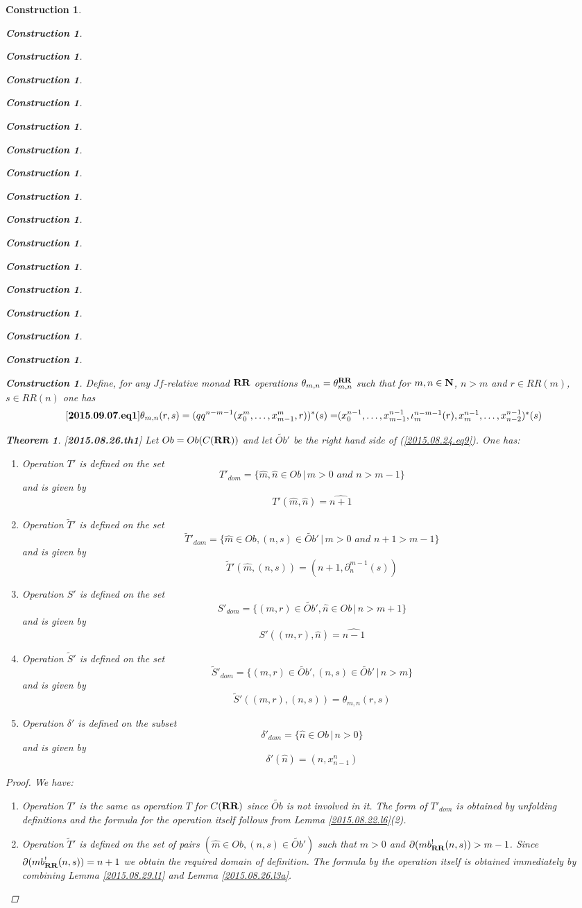 \documentclass[12pt]{amsart}
\newenvironment{eq}{\begin{equation}}{\end{equation}}
\newtheorem{theorem}[proposition]{Theorem}
\newtheorem{construction}[proposition]{Construction}
\newcommand{\llabel}[1]{\label{#1}[{\bf #1}]}
\newcommand{\nn}{{\bf N\rm}}
\newcommand{\nat}{\nn}
\newcommand{\wt}{\widetilde}
\newcommand{\wh}{\widehat}
\newcommand{\mbind}[1]{{#1^*}}
\newcommand{\RR}{{\bf RR}}
\begin{document}
\begin{construction}
\begin{construction}
\begin{construction}
\begin{construction}
\begin{construction}
\begin{construction}
\begin{construction}
\begin{construction}
\begin{construction}
\begin{construction}
\begin{construction}
\begin{construction}
\begin{construction}
\begin{construction}
\begin{construction}
\begin{construction}
\begin{construction}
Define, for any $Jf$-relative monad $\RR$ operations $\theta_{m,n}=\theta^{\RR}_{m,n}$ such that for $m,n\in\nat$, $n>m$ and $r\in RR(m)$, $s\in RR(n)$ one has
%
\begin{eq}
\llabel{2015.09.07.eq1}
\theta_{m,n}(r,s)=\mbind{(qq^{n-m-1}(x_0^m,\dots,x_{m-1}^m,r))}(s)=$$
$$\mbind{(x_0^{n-1},\dots,x_{m-1}^{n-1},\iota_{m}^{n-m-1}(r),x_m^{n-1},\dots,x_{n-2}^{n-1})}(s)
\end{eq}
%
\begin{theorem}
\llabel{2015.08.26.th1}
Let $Ob=Ob(C(\RR))$ and let $\wt{Ob}'$ be the right hand side of (\ref{2015.08.24.eq9}). One has:
%
\begin{enumerate}
\item Operation $T'$ is defined on the set
%
$$T'_{dom}=\{\wh{m},\wh{n}\in Ob\,|\,m>0\,\,and\,\,n>m-1\}$$
%
and is given by 
%
$$T'(\wh{m},\wh{n})=\wh{n+1}$$
%
\item Operation $\wt{T}'$ is defined on the set 
%
$$\wt{T}'_{dom}=\{\wh{m}\in Ob, (n,s)\in \wt{Ob}'\,|\,m>0\,\,and\,\,n+1>m-1\}$$
%
and is given by
%
$$\wt{T}'(\wh{m},(n,s))=(n+1,\partial_n^{m-1}(s))$$
%
\item Operation $S'$ is defined on the set
%
$$S'_{dom}=\{(m,r)\in \wt{Ob}',\wh{n}\in Ob\,|\,n>m+1\}$$
%
and is given by
%
$$S'((m,r),\wh{n})=\wh{n-1}$$
%
\item Operation $\wt{S}'$ is defined on the set 
%
$$\wt{S}'_{dom}=\{(m,r)\in\wt{Ob}',(n,s)\in \wt{Ob}'\,|\,n>m\}$$
%
and is given by
%
$$\wt{S}'((m,r),(n,s))=\theta_{m,n}(r,s)$$
%
\item Operation $\delta'$ is defined on the subset
%
$$\delta'_{dom}=\{\wh{n}\in Ob\,|\,n>0\}$$
%
and is given by
%
$$\delta'(\wh{n})=(n,x_{n-1}^n)$$
%
\end{enumerate}
\end{theorem}
%
\begin{proof}
We have:
%
\begin{enumerate}
%
\item Operation $T'$ is the same as operation $T$ for $C(\RR)$ since $\wt{Ob}$ is not involved in it. The form of $T'_{dom}$ is obtained by unfolding definitions and the formula for the operation itself follows from Lemma \ref{2015.08.22.l6}(2).
%
\item Operation $\wt{T}'$ is defined on the set of pairs $(\wh{m}\in Ob, (n,s)\in \wt{Ob}')$ such that $m>0$ and $\partial(mb_{\RR}^!(n,s))>m-1$. Since $\partial(mb_{\RR}^!(n,s))=n+1$ we obtain the required domain of definition. The formula by the operation itself is obtained immediately by combining Lemma \ref{2015.08.29.l1} and Lemma \ref{2015.08.26.l3a}.

\end{enumerate}
\end{proof}
\end{construction}
\end{construction}
\end{construction}
\end{construction}
\end{construction}
\end{construction}
\end{construction}
\end{construction}
\end{construction}
\end{construction}
\end{construction}
\end{construction}
\end{construction}
\end{construction}
\end{construction}
\end{construction}
\end{construction}
\end{document}
